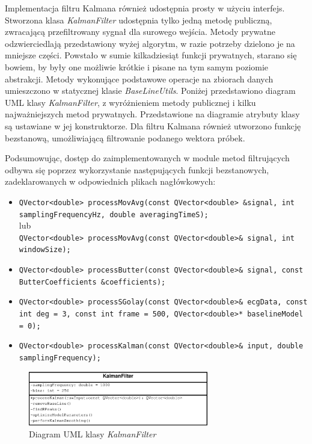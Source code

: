 Implementacja filtru Kalmana również udostępnia prosty w użyciu interfejs. Stworzona klasa \textit{KalmanFilter} udostępnia tylko jedną metodę publiczną, zwracającą przefiltrowany sygnał dla surowego wejścia. Metody prywatne odzwierciedlają przedstawiony wyżej algorytm, w razie potrzeby dzielono je na mniejsze części. Powstało w sumie kilkadziesiąt funkcji prywatnych, starano się bowiem, by były one możliwie krótkie i pisane na tym samym poziomie abstrakcji. Metody wykonujące podstawowe operacje na zbiorach danych umieszczono w statycznej klasie \textit{BaseLineUtils}. Poniżej przedstawiono diagram UML klasy \textit{KalmanFilter}, z wyróżnieniem metody publicznej i kilku najważniejszych metod prywatnych. Przedstawione na diagramie atrybuty klasy są ustawiane w jej konstruktorze. Dla filtru Kalmana również utworzono funkcję bezstanową, umożliwiającą filtrowanie podanego wektora próbek.

Podsumowując, dostęp do zaimplementowanych w module metod filtrujących odbywa się poprzez wykorzystanie następujących funkcji bezstanowych, zadeklarowanych w odpowiednich plikach nagłówkowych:

\begin{itemize}

\item \texttt{QVector<double> processMovAvg(const QVector<double> \&signal, int samplingFrequencyHz, double averagingTimeS);}\\ lub \\ \texttt{QVector<double> processMovAvg(const QVector<double>\& signal, int windowSize);}
\item \texttt{QVector<double> processButter(const QVector<double>\& signal, const ButterCoefficients \&coefficients);}
\item \texttt{QVector<double> processSGolay(const QVector<double>\& ecgData, const int deg = 3, const int frame = 500, QVector<double>* baselineModel = 0);}
\item \texttt{QVector<double> processKalman(const QVector<double>\& input, double samplingFrequency);}
\end{itemize}

\begin{figure}[H]
\centering
	\includegraphics[width=0.7\textwidth]{ECG_BASELINE/figures/KalmanFilter.eps}
\caption{Diagram UML klasy \textit{KalmanFilter}}
\label{KF-UML}
\end{figure}


